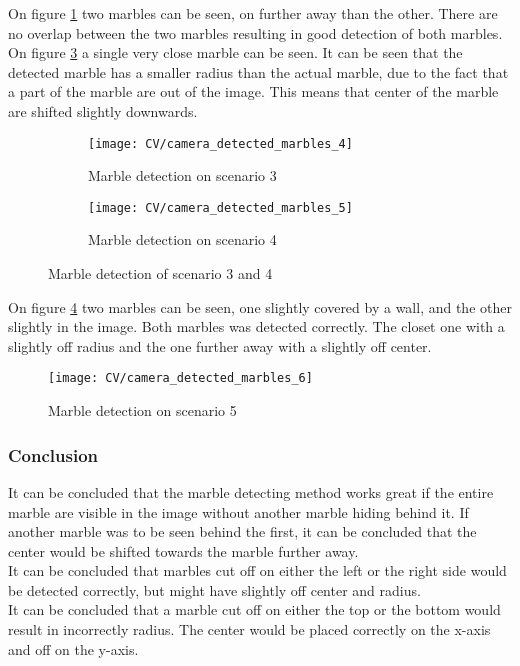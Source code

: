 \documentclass[../Head/Main.tex]{subfiles}
\begin{document}
On figure \ref{fig:md_3} two marbles can be seen, on further away than the other. There are no overlap between the two marbles resulting in good detection of both marbles.\\
On figure \ref{fig:md_4} a single very close marble can be seen. It can be seen that the detected marble has a smaller radius than the actual marble, due to the fact that a part of the marble are out of the image. This means that center of the marble are shifted slightly downwards.
\begin{figure}[H]
	\centering
	\begin{subfigure}[b]{0.45\textwidth}
		\centering
		\texttt{[image: CV/camera\_detected\_marbles\_4]}
		\caption{Marble detection on scenario 3}
		\label{fig:md_3}
	\end{subfigure}
	\hfill
	\begin{subfigure}[b]{0.45\textwidth}
		\centering
		\texttt{[image: CV/camera\_detected\_marbles\_5]}
		\caption{Marble detection on scenario 4}
		\label{fig:md_4}
	\end{subfigure}
	\caption{Marble detection of scenario 3 and 4}
\end{figure}

On figure \ref{fig:md_5} two marbles can be seen, one slightly covered by a wall, and the other slightly in the image. Both marbles was detected correctly. The closet one with a slightly off radius and the one further away with a slightly off center. 
\begin{figure}[H]
	\centering
	\texttt{[image: CV/camera\_detected\_marbles\_6]}
	\caption{Marble detection on scenario 5}
	\label{fig:md_5}
\end{figure}

\subsubsection*{Conclusion}
It can be concluded that the marble detecting method works great if the entire marble are visible in the image without another marble hiding behind it. If another marble was to be seen behind the first, it can be concluded that the center would be shifted towards the marble further away. \\
It can be concluded that marbles cut off on either the left or the right side would be detected correctly, but might have slightly off center and radius.\\
It can be concluded that a marble cut off on either the top or the bottom would result in incorrectly  radius. The center would be placed correctly on the x-axis and off on the y-axis. 
\end{document}
